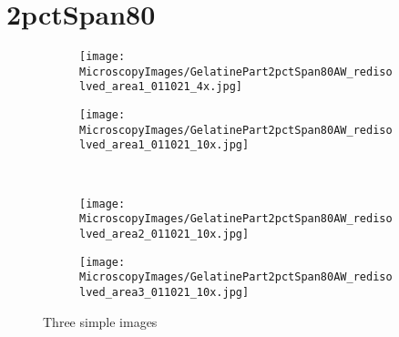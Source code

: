 \section{2pctSpan80}



\begin{figure}[H]
     \centering
     \begin{subfigure}[b]{0.49\textwidth}
         \centering
         \texttt{[image: MicroscopyImages/GelatinePart2pctSpan80AW\_redisolved\_area1\_011021\_4x.jpg]}
         \caption{}
         \label{fig:GelatinePart2pctSpanRedis4x}
     \end{subfigure}
     \hfill
     \begin{subfigure}[b]{0.49\textwidth}
         \centering
         \texttt{[image: MicroscopyImages/GelatinePart2pctSpan80AW\_redisolved\_area1\_011021\_10x.jpg]}
         \caption{}
         \label{fig:GelatinePart2pctSpanRedis10xA1}
     \end{subfigure}
     \\
     \vspace{4pt}
     \begin{subfigure}[b]{0.49\textwidth}
         \centering
         \texttt{[image: MicroscopyImages/GelatinePart2pctSpan80AW\_redisolved\_area2\_011021\_10x.jpg]}
         \caption{}
         \label{fig:GelatinePart2pctSpanRedis10xA2}
     \end{subfigure}
     \hfill
     \begin{subfigure}[b]{0.49\textwidth}
         \centering
         \texttt{[image: MicroscopyImages/GelatinePart2pctSpan80AW\_redisolved\_area3\_011021\_10x.jpg]}
         \caption{}
         \label{fig:GelatinePart2pctSpanRedis10xA3}
     \end{subfigure}
        \caption{Three simple images}
        \label{fig:GelatinePart2pctSpan}
\end{figure}

